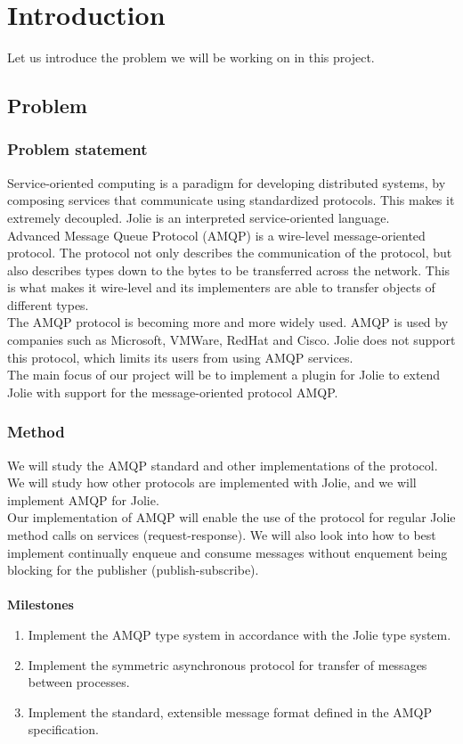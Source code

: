 \section{Introduction}
Let us introduce the problem we will be working on in this project.
\subsection{Problem}
\subsubsection{Problem statement}
Service-oriented computing is a paradigm for developing distributed systems, by composing services that communicate using standardized protocols. This makes it extremely decoupled. Jolie is an interpreted service-oriented language.\\
Advanced Message Queue Protocol (AMQP) is a wire-level message-oriented protocol. The protocol not only describes the communication of the protocol, but also describes types down to the bytes to be transferred across the network. This is what makes it wire-level and its implementers are able to transfer objects of different types.\\
The AMQP protocol is becoming more and more widely used. AMQP is used by companies such as Microsoft, VMWare, RedHat and Cisco. Jolie does not support this protocol, which limits its users from using AMQP services.\\
The main focus of our project will be to implement a plugin for Jolie to extend Jolie with support for the message-oriented protocol AMQP.
\subsubsection{Method}
We will study the AMQP standard and other implementations of the protocol. We will study how other protocols are implemented with Jolie, and we will implement AMQP for Jolie.\\
Our implementation of AMQP will enable the use of the protocol for regular Jolie method calls on services (request-response). We will also look into how to best implement continually enqueue and consume messages without enquement being blocking for the publisher (publish-subscribe).\\
\\\textbf{Milestones}
\begin{enumerate}
\item Implement the AMQP type system in accordance with the Jolie type system. 
\item Implement the symmetric asynchronous protocol for transfer of messages between processes. 
\item Implement the standard, extensible message format defined in the AMQP specification. 
\end{enumerate}

